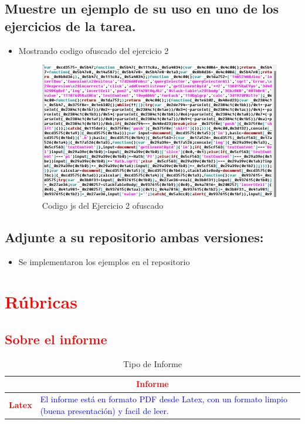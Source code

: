\documentclass{article}
\begin{document}
		\subsection{Muestre un ejemplo de su uso en uno de los ejercicios de la tarea.}
	\begin{itemize}	
		\item Mostrando codigo ofuscado del ejercicio 2
		\begin{figure}[H]
            \centering
            \includegraphics[width=\textwidth]{img/of}
            \caption{Codigo js del Ejercicio 2 ofuscado}
            \label{fig:pagina}
        \end{figure}
	\end{itemize}
		\subsection{Adjunte a su repositorio ambas versiones:}
	\begin{itemize}	
		\item Se implementaron los ejemplos en el repositorio
		
	\end{itemize}	

	\section{\textcolor{red}{Rúbricas}}
	
	\subsection{\textcolor{red}{Sobre el informe}}
	\begin{table}[H]
		\caption{Tipo de Informe}
		\setlength{\tabcolsep}{0.5em} %
		{\renewcommand{\arraystretch}{1.5}%
		\begin{tabular}{|p{3cm}|p{12cm}|}
			\hline
			\multicolumn{2}{|c|}{\textbf{\textcolor{red}{Informe}}}  \\
			\hline 
			\textbf{\textcolor{red}{Latex}} & \textcolor{blue}{El informe está en formato PDF desde Latex,  con un formato limpio (buena presentación) y facil de leer.}   \\ 
			\hline 
			
			
		\end{tabular}
	}
	\end{table}
	
\end{document}
